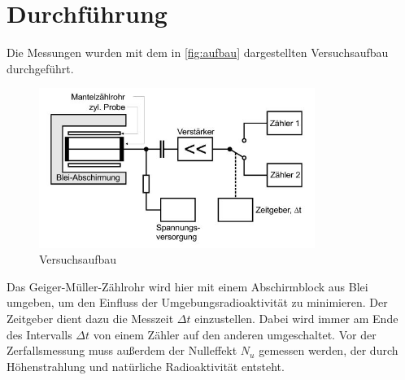 \section{Durchführung}
\label{sec:Durchführung}
Die Messungen wurden mit dem in \autoref{fig:aufbau} dargestellten Versuchsaufbau durchgeführt. 
\begin{figure}[H]
	\centering
	\includegraphics[width=0.8\textwidth]{content/aufbau.JPG}
	\caption{Versuchsaufbau \cite{sample}}
	\label{fig:aufbau}
\end{figure} 
Das Geiger-Müller-Zählrohr wird hier mit einem Abschirmblock aus Blei umgeben, um den Einfluss der Umgebungsradioaktivität zu minimieren. Der Zeitgeber dient dazu die Messzeit $\Delta t$ einzustellen. Dabei wird immer am Ende des Intervalls $\Delta t$ von einem Zähler auf den anderen umgeschaltet.
Vor der Zerfallsmessung muss außerdem der Nulleffekt $N_u$ gemessen werden, der durch Höhenstrahlung und natürliche Radioaktivität entsteht.